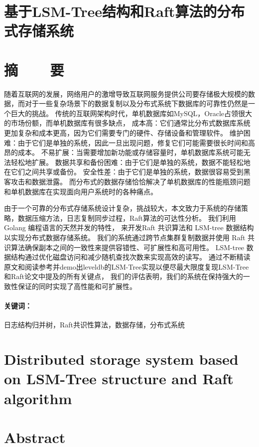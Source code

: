 \section*{基于LSM-Tree结构和Raft算法的分布式存储系统}
\section*{摘\ \ \ \ 要}

随着互联网的发展，网络用户的激增导致互联网服务提供公司要存储极大规模的数据，而对于一些复杂场景下的数据复制以及分布式系统下数据库的可靠性仍然是一个巨大的挑战。
传统的互联网架构时代，单机数据库如MySQL，Oracle占领很大的市场份额，而单机数据库有很多缺点，
成本高：它们通常比分布式数据库系统更加复杂和成本更高，因为它们需要专门的硬件、存储设备和管理软件。
维护困难：由于它们是单独的系统，因此一旦出现问题，修复它们可能需要很长时间和高昂的成本。
不易扩展：当需要增加新功能或存储容量时，单机数据库系统可能无法轻松地扩展。
数据共享和备份困难：由于它们是单独的系统，数据不能轻松地在它们之间共享或备份。
安全性差：由于它们是单独的系统，数据很容易受到黑客攻击和数据泄露。
而分布式的数据存储恰恰解决了单机数据库的性能瓶颈问题和单机数据库在实现面向用户系统时的各种痛点。


由于一个可靠的分布式存储系统设计复杂，挑战较大，本文致力于系统的存储策略，数据压缩方法，日志复制同步过程，Raft算法的可达性分析。
我们利用 Golang 编程语言的天然并发的特性， 来开发Raft 共识算法和 LSM-tree 数据结构以实现分布式数据存储系统。 
我们的系统通过跨节点集群复制数据并使用 Raft 共识算法确保副本之间的一致性来提供容错性、可扩展性和高可用性。 LSM-tree 数据结构通过优化磁盘访问和减少随机查找次数来实现高效的读写。 
通过不断精读原文和阅读参考并demo出leveldb的LSM-Tree实现以便尽最大限度复现LSM-Tree和Raft论文中提及的所有关键点，
我们的评估表明，我们的系统在保持强大的一致性保证的同时实现了高性能和可扩展性。

\paragraph{关键词：} 日志结构归并树，Raft共识性算法，数据存储，分布式系统

\clearpage


\section*{Distributed storage system based on LSM-Tree structure and Raft algorithm}

\section*{Abstract}

